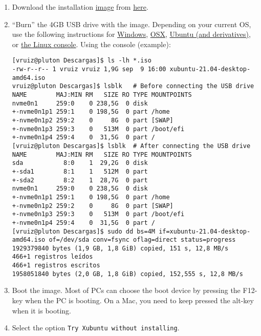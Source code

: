 \begin{enumerate}
  \item Download the
    installation \href{https://en.wikipedia.org/wiki/Disk_image}{image}
    from \href{https://xubuntu.org/download/}{here}.
    
  \item ``Burn'' the 4GB USB drive with the image. Depending on your
    current OS, use the following instructions
    for \href{https://ubuntu.com/tutorials/create-a-usb-stick-on-windows#1-overview}{Windows}, \href{https://ubuntu.com/tutorials/create-a-usb-stick-on-macos#1-overview}{OSX}, \href{https://ubuntu.com/tutorials/create-a-usb-stick-on-ubuntu#1-overview}{Ubuntu
    (and derivatives)},
    or \href{https://askubuntu.com/questions/372607/how-to-create-a-bootable-ubuntu-usb-flash-drive-from-terminal}{the Linux
    console}. Using the console (example):

\begin{verbatim}
[vruiz@pluton Descargas]$ ls -lh *.iso
-rw-r--r-- 1 vruiz vruiz 1,9G sep  9 16:00 xubuntu-21.04-desktop-amd64.iso
vruiz@pluton Descargas]$ lsblk   # Before connecting the USB drive
NAME        MAJ:MIN RM   SIZE RO TYPE MOUNTPOINTS
nvme0n1     259:0    0 238,5G  0 disk 
+-nvme0n1p1 259:1    0 198,5G  0 part /home
+-nvme0n1p2 259:2    0     8G  0 part [SWAP]
+-nvme0n1p3 259:3    0   513M  0 part /boot/efi
+-nvme0n1p4 259:4    0  31,5G  0 part /
[vruiz@pluton Descargas]$ lsblk  # After connecting the USB drive 
NAME        MAJ:MIN RM   SIZE RO TYPE MOUNTPOINTS
sda           8:0    1  29,2G  0 disk 
+-sda1        8:1    1   512M  0 part 
+-sda2        8:2    1  28,7G  0 part 
nvme0n1     259:0    0 238,5G  0 disk 
+-nvme0n1p1 259:1    0 198,5G  0 part /home
+-nvme0n1p2 259:2    0     8G  0 part [SWAP]
+-nvme0n1p3 259:3    0   513M  0 part /boot/efi
+-nvme0n1p4 259:4    0  31,5G  0 part /
[vruiz@pluton Descargas]$ sudo dd bs=4M if=xubuntu-21.04-desktop-amd64.iso of=/dev/sda conv=fsync oflag=direct status=progress
1929379840 bytes (1,9 GB, 1,8 GiB) copied, 151 s, 12,8 MB/s
466+1 registros leídos
466+1 registros escritos
1958051840 bytes (2,0 GB, 1,8 GiB) copied, 152,555 s, 12,8 MB/s
\end{verbatim}

\item Boot the image. Most of PCs can choose the boot device by pressing the
  F12-key when the PC is booting. On a Mac, you need to keep pressed
  the alt-key when it is booting.
  
\item Select the option \texttt{Try Xubuntu without installing}.


\end{enumerate}
